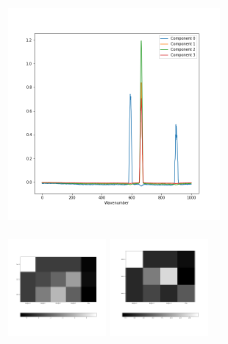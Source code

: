 \documentclass{article}
\begin{document}
\begin{figure}
  \includegraphics[width=0.5\textwidth]{figures/raman_sim_3_encode_layer_1_finetune_13.png}
\end{figure}


\begin{figure}
  \includegraphics[width=0.23\textwidth]{figures/raman_sim_3_encode_layer_2_finetune_13.png}
  \includegraphics[width=0.23\textwidth]{figures/raman_sim_3_encode_layer_3_finetune_13.png}
\end{figure}
\end{document}
